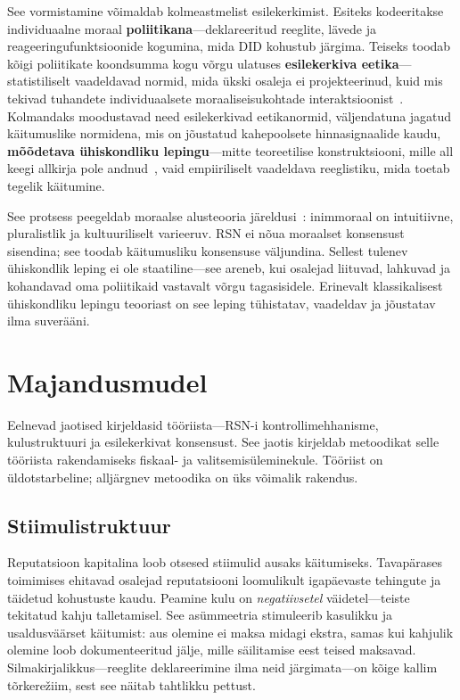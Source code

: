 \documentclass[11pt,a4paper,twocolumn]{article}
\begin{document}
See vormistamine võimaldab kolmeastmelist esilekerkimist. Esiteks kodeeritakse individuaalne moraal \textbf{poliitikana}---deklareeritud reeglite, lävede ja reageeringufunktsioonide kogumina, mida DID kohustub järgima. Teiseks toodab kõigi poliitikate koondsumma kogu võrgu ulatuses \textbf{esilekerkiva eetika}---statistiliselt vaadeldavad normid, mida ükski osaleja ei projekteerinud, kuid mis tekivad tuhandete individuaalsete moraaliseisukohtade interaktsioonist~\cite{durkheim1893}. Kolmandaks moodustavad need esilekerkivad eetikanormid, väljendatuna jagatud käitumuslike normidena, mis on jõustatud kahepoolsete hinnasignaalide kaudu, \textbf{mõõdetava ühiskondliku lepingu}---mitte teoreetilise konstruktsiooni, mille all keegi allkirja pole andnud~\cite{rawls1971}, vaid empiiriliselt vaadeldava reeglistiku, mida toetab tegelik käitumine.

See protsess peegeldab moraalse alusteooria järeldusi~\cite{haidt2012}: inimmoraal on intuitiivne, pluralistlik ja kultuuriliselt varieeruv. RSN ei nõua moraalset konsensust sisendina; see toodab käitumusliku konsensuse väljundina. Sellest tulenev ühiskondlik leping ei ole staatiline---see areneb, kui osalejad liituvad, lahkuvad ja kohandavad oma poliitikaid vastavalt võrgu tagasisidele. Erinevalt klassikalisest ühiskondliku lepingu teooriast on see leping tühistatav, vaadeldav ja jõustatav ilma suverääni.

\section{Majandusmudel}

Eelnevad jaotised kirjeldasid tööriista---RSN-i kontrollimehhanisme, kulustruktuuri ja esilekerkivat konsensust. See jaotis kirjeldab metoodikat selle tööriista rakendamiseks fiskaal- ja valitsemisüleminekule. Tööriist on üldotstarbeline; alljärgnev metoodika on üks võimalik rakendus.

\subsection{Stiimulistruktuur}

Reputatsioon kapitalina loob otsesed stiimulid ausaks käitumiseks. Tavapärases toimimises ehitavad osalejad reputatsiooni loomulikult igapäevaste tehingute ja täidetud kohustuste kaudu. Peamine kulu on \emph{negatiivsetel} väidetel---teiste tekitatud kahju talletamisel. See asümmeetria stimuleerib kasulikku ja usaldusväärset käitumist: aus olemine ei maksa midagi ekstra, samas kui kahjulik olemine loob dokumenteeritud jälje, mille säilitamise eest teised maksavad. Silmakirjalikkus---reeglite deklareerimine ilma neid järgimata---on kõige kallim tõrkerežiim, sest see näitab tahtlikku pettust.
\end{document}
